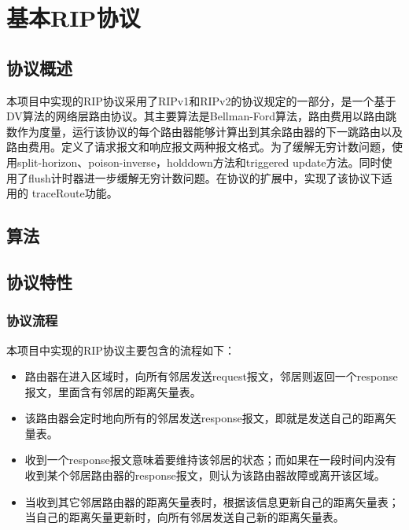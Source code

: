 \section{基本RIP协议} %
\label{sec:rip}
	\subsection{协议概述} %
	\label{sub:协议概述}
		本项目中实现的RIP协议采用了RIPv1和RIPv2的协议规定的一部分，是一个基于DV算法的网络层路由协议。其主要算法是Bellman-Ford算法，路由费用以路由跳数作为度量，运行该协议的每个路由器能够计算出到其余路由器的下一跳路由以及路由费用。定义了请求报文和响应报文两种报文格式。为了缓解无穷计数问题，使用split-horizon、poison-inverse，holddown方法和triggered update方法。同时使用了flush计时器进一步缓解无穷计数问题。在协议的扩展中，实现了该协议下适用的 traceRoute功能。
	\subsection{算法} %
	\label{sub:算法}
	
	\subsection{协议特性} %
	\label{sub:协议特性}
	\subsubsection{协议流程} %
		\label{ssub:协议流程}
		本项目中实现的RIP协议主要包含的流程如下：
		\begin{itemize}
			\item 路由器在进入区域时，向所有邻居发送request报文，邻居则返回一个response报文，里面含有邻居的距离矢量表。
			\item 该路由器会定时地向所有的邻居发送response报文，即就是发送自己的距离矢量表。
			\item 收到一个response报文意味着要维持该邻居的状态；而如果在一段时间内没有收到某个邻居路由器的response报文，则认为该路由器故障或离开该区域。
			\item 当收到其它邻居路由器的距离矢量表时，根据该信息更新自己的距离矢量表；当自己的距离矢量更新时，向所有邻居发送自己新的距离矢量表。
		\end{itemize}
